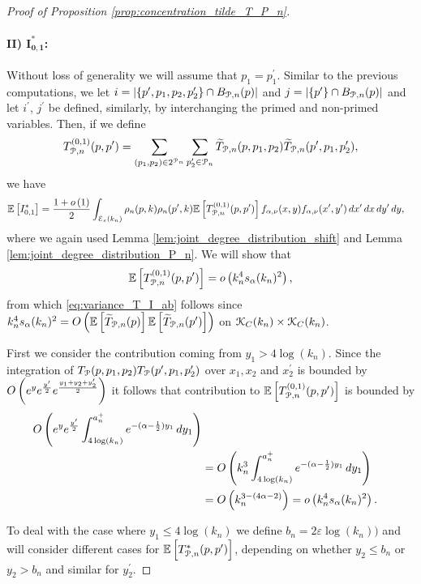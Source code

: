 \begin{proof}[Proof of Proposition \ref{prop:concentration_tilde_T_P_n}]
\paragraph{II) $\bm{I_{0,1}^\ast}$:}
Without loss of generality we will assume that $p_1 = p_1^\prime$. Similar to the previous computations, we let $i = |\{p^\prime, p_1, p_2, p_2^\prime\} \cap B_{{\mathcal P},n}(p)|$ and $j = |\{p^\prime\} \cap B_{{\mathcal P},n}(p)|$ and let $i^\prime$, $j^\prime$ be defined, similarly, by interchanging the primed and non-primed variables. Then, if we define
\[
	T^{(0,1)}_{{\mathcal P},n}(p,p^\prime) = \sum_{(p_1,p_2) \in 2^{{\mathcal P}_n}} \sum_{p_2^\prime \in {\mathcal P}_n} \widetilde{T}_{{\mathcal P},n}(p,p_1,p_2) \widetilde{T}_{{\mathcal P},n}(p^\prime,p_1,p_2^\prime),
\]
we have
\begin{align*}
	\mathbb{E}\left[I_{0,1}^\ast\right] &= \frac{1+o\left(1\right)}{2} \int_{\mathcal{E}_{\varepsilon}(k_n)} \rho_n(p,k)\rho_n(p^\prime,k)
			\mathbb{E}\left[T^{(0,1)}_{{\mathcal P},n}(p,p^\prime)\right] f_{\alpha,\nu}(x,y)
			f_{\alpha,\nu}(x^\prime,y^\prime) \, dx^\prime \, dx \, dy^\prime \, dy,
\end{align*} 
where we again used Lemma  \ref{lem:joint_degree_distribution_shift} and  Lemma \ref{lem:joint_degree_distribution_P_n}.
We will show that 
\[
	\mathbb{E}\left[T^{(0,1)}_{{\mathcal P},n}(p,p^\prime)\right] = o\left(k_n^4 s_\alpha(k_n)^2\right),
\] 
from which \eqref{eq:variance_T_I_ab} follows since $k_n^4 s_\alpha(k_n)^2 = O\left(\mathbb{E}\left[\widetilde{T}_{{\mathcal P},n}(p)\right] \mathbb{E}\left[\widetilde{T}_{{\mathcal P},n}(p^\prime)\right]\right)$ on ${\mathcal K}_{C}(k_n) \times {\mathcal K}_{C}(k_n)$.

First we consider the contribution coming from $y_1 > 4 \log(k_n)$. Since the integration of $T_{{\mathcal P}}(p,p_1,p_2) T_{{\mathcal P}}(p^\prime,p_1,p_2^\prime)$ over $x_1, x_2$ and $x_2^\prime$ is bounded by $O\left(e^{y}e^{\frac{y^\prime}{2}} e^{\frac{y_1 + y_2 + y_2^\prime}{2}}\right)$ it follows that contribution to $\mathbb{E}\left[T^{(0,1)}_{{\mathcal P},n}(p,p^\prime)\right]$ is bounded by
\begin{align*}
	O\left(e^{y}e^{\frac{y^\prime}{2}} \int_{4\log(k_n)}^{a_n^+} e^{-(\alpha - \frac{1}{2})y_1} \, dy_1\right)\\
	&= O\left(k_n^3 \int_{4\log(k_n)}^{a_n^+} e^{-(\alpha - \frac{1}{2})y_1} \, dy_1\right)\\
	&= O\left(k_n^{3 - (4\alpha - 2)}\right) = o\left(k_n^4 s_\alpha(k_n)^2\right).
\end{align*}

To deal with the case where $y_1 \le 4\log(k_n)$ we define $b_n = 2\varepsilon\log(k_n))$ and will consider different cases for $\mathbb{E}\left[T^\ast_{{\mathcal P},n}(p,p^\prime)\right]$, depending on whether $y_2 \le b_n$ or $y_2 > b_n$ and similar for $y_2^\prime$. 


\end{proof}
